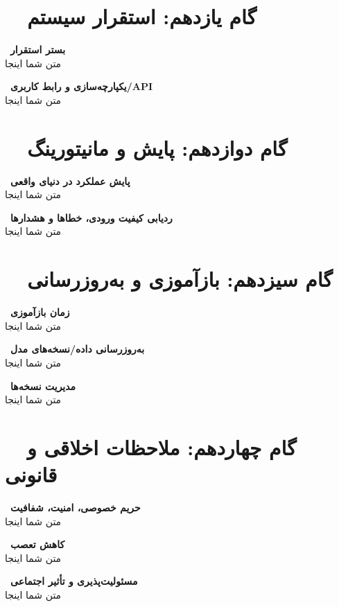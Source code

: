 \documentclass[12pt, a4paper]{article}
\newcommand{\field}[2]{%
    \noindent\textbf{\textcolor{primary}{\faChevronLeft\ #1}}\\[0.15cm]
    #2\par\vspace{0.6cm}
}
\begin{document}
\newpage
\section[گام یازدهم: استقرار سیستم]{\faUpload\ \ گام یازدهم: استقرار سیستم}
\begin{stepbox}

\field{بستر استقرار}{متن شما اینجا}

\field{یکپارچه‌سازی و رابط کاربری/API}{متن شما اینجا}

\end{stepbox}

\newpage
\section[گام دوازدهم: پایش و مانیتورینگ]{\faChartArea\ \ گام دوازدهم: پایش و مانیتورینگ}
\begin{stepbox}

\field{پایش عملکرد در دنیای واقعی}{متن شما اینجا}

\field{ردیابی کیفیت ورودی، خطاها و هشدارها}{متن شما اینجا}

\end{stepbox}

\newpage
\section[گام سیزدهم: بازآموزی و به‌روزرسانی]{\faSync\ \ گام سیزدهم: بازآموزی و به‌روزرسانی}
\begin{stepbox}

\field{زمان بازآموزی}{متن شما اینجا}

\field{به‌روزرسانی داده/نسخه‌های مدل}{متن شما اینجا}

\field{مدیریت نسخه‌ها}{متن شما اینجا}

\end{stepbox}

\newpage
\section[گام چهاردهم: ملاحظات اخلاقی و قانونی]{\faBalanceScale\ \ گام چهاردهم: ملاحظات اخلاقی و قانونی}
\begin{stepbox}

\field{حریم خصوصی، امنیت، شفافیت}{متن شما اینجا}

\field{کاهش تعصب}{متن شما اینجا}

\field{مسئولیت‌پذیری و تأثیر اجتماعی}{متن شما اینجا}

\end{stepbox}
\end{document}
